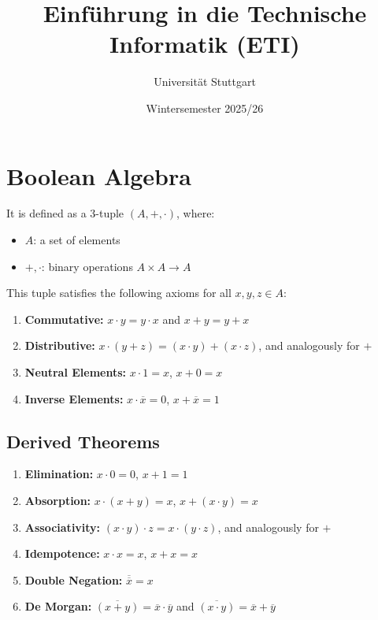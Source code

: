 \documentclass{article}
\begin{document}
\title{Einführung in die Technische Informatik (ETI)}
\date{Wintersemester 2025/26}
\author{Universität Stuttgart}
\maketitle
\tableofcontents

\newpage
\section{Boolean Algebra}
It is defined as a 3-tuple $(A, +, \cdot)$, where:

\begin{itemize}
  \item $A$: a set of elements
  \item $+, \cdot$: binary operations $A \times A \rightarrow A$
\end{itemize}

This tuple satisfies the following axioms for all $x, y, z \in A$:

\begin{enumerate}
  \item \textbf{Commutative:} $x \cdot y = y \cdot x$ and $x + y = y + x$
  \item \textbf{Distributive:} $x \cdot (y + z) = (x \cdot y) + (x \cdot z)$, and analogously for $+$
  \item \textbf{Neutral Elements:} $x \cdot 1 = x$, \; $x + 0 = x$
  \item \textbf{Inverse Elements:} $x \cdot \overline{x} = 0$, \; $x + \overline{x} = 1$
\end{enumerate}

\subsection*{Derived Theorems}
\begin{enumerate}
  \item \textbf{Elimination:} $x \cdot 0 = 0$, \; $x + 1 = 1$
  \item \textbf{Absorption:} $x \cdot (x + y) = x$, \; $x + (x \cdot y) = x$
  \item \textbf{Associativity:} $(x \cdot y) \cdot z = x \cdot (y \cdot z)$, and analogously for $+$
  \item \textbf{Idempotence:} $x \cdot x = x$, \; $x + x = x$
  \item \textbf{Double Negation:} $\overline{\overline{x}} = x$
  \item \textbf{De Morgan:} $\overline{(x + y)} = \overline{x} \cdot \overline{y}$ and $\overline{(x \cdot y)} = \overline{x} + \overline{y}$
\end{enumerate}
\end{document}
